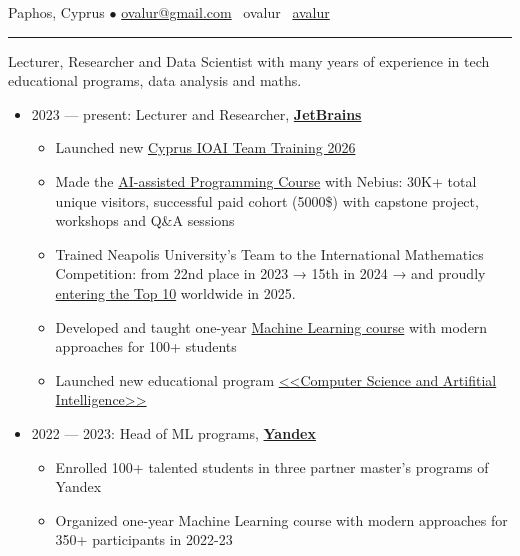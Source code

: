 \documentclass[11pt]{article}
\begin{document}
%

\vspace{0.5em}

\noindent Paphos, Cyprus $\bullet$ \href{mailto:ovalur@gmail.com}{ovalur@gmail.com} \faSendO~ovalur
\faGithub~\href{https://github.com/avalur}{avalur}

\vspace{0.5em}
\hrule
\vspace{0.5em}

Lecturer, Researcher and Data Scientist with many years of experience in
tech educational programs, data analysis and maths.

\vspace{0.5em}
\begin{itemize}
	\item 2023 — present: Lecturer and Researcher, \textbf{\href{https://jetbrains.com}{JetBrains}}
	\begin{itemize}
		\item Launched new \href{https://lp.jetbrains.com/academy/cyprus-ioai-training/}{Cyprus IOAI Team Training 2026}
		\item Made the \href{https://futurecoding.ai/}{AI-assisted Programming Course} with Nebius: 30K+ total unique visitors,
        successful paid cohort (5000\$) with capstone project, workshops and Q\&A sessions
		\item Trained Neapolis University's Team to the International Mathematics Competition:
		from 22nd place in 2023 → 15th in 2024 → and proudly \href{https://www.linkedin.com/posts/aleksandr-avdiushenko_techne-notes-activity-7357816957242380289-GWBs}{entering the Top 10} worldwide in 2025.
		\item Developed and taught one-year \href{https://avalur.github.io/mlcourse/index.html}{Machine Learning course} with
		modern approaches for 100+ students
		\item Launched new educational program \href{https://blog.jetbrains.com/education/2023/05/03/introducing-the-computer-science-and-artificial-intelligence-bachelor-s-program-with-neapolis-university-paphos/}{<<Computer Science and Artifitial Intelligence>>}
	\end{itemize}
	\item 2022 — 2023:
	Head of ML programs, \textbf{\href{https://ya.ru/}{Yandex}}
	\begin{itemize}
		\item Enrolled 100+ talented students in three partner master's programs of Yandex
		\item Organized one-year Machine Learning course with modern approaches for 350+ participants in 2022-23
	\end{itemize}


\end{itemize}
\end{document}
